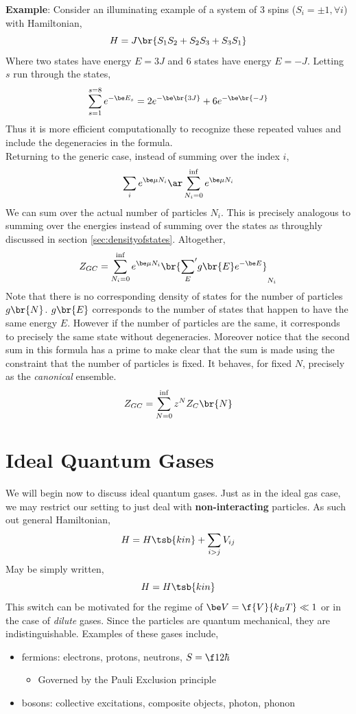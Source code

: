 \documentclass{article}
\begin{document}
{\textbf{Example}: Consider an illuminating example of a system of 3 spins ($S_i = \pm 1, \forall i$) with Hamiltonian,
\[ H = J \br{S_1 S_2 + S_2 S_3 + S_3 S_1} \]
Where two states have energy $E = 3J$ and 6 states have energy $E=-J$. Letting $s$ run through the states,
\[ \sum_{s=1}^{s=8} e^{-\be E_s} = 2e^{-\be\br{3J}} + 6e^{-\be\br{-J}} \]
Thus it is more efficient computationally to recognize these repeated values and include the degeneracies in the formula.\\

Returning to the generic case, instead of summing over the index $i$,
\[ \sum_{i} e^{\be \mu N_i} \ar \sum_{N_i = 0}^{\inf} e^{\be \mu N_i} \]
We can sum over the actual number of particles $N_i$. This is precisely analogous to summing over the energies instead of summing over the states as throughly discussed in section \ref{sec:densityofstates}. Altogether,
\[ Z_{GC} = \sum_{N_i = 0}^{\inf} e^{\be \mu N_i} \br{{\sum_{E}}' g\br{E}e^{-\be E}}_{N_i} \]
Note that there is no corresponding density of states for the number of particles $g\br{N}$. $g\br{E}$ corresponds to the number of states that happen to have the same energy $E$. However if the number of particles are the same, it corresponds to precisely the same state without degeneracies. Moreover notice that the second sum in this formula has a prime to make clear that the sum is made using the constraint that the number of particles is fixed. It behaves, for fixed $N$, precisely as the \textit{canonical} ensemble.
\[ Z_{GC} = \sum_{N = 0}^{\inf} z^{N} Z_{C}\br{N} \]


\section{Ideal Quantum Gases}

We will begin now to discuss ideal quantum gases. Just as in the ideal gas case, we may restrict our setting to just deal with \textbf{non-interacting} particles. As such out general Hamiltonian,
\[ H = H\tsb{kin} + \sum_{i>j} V_{ij} \]
May be simply written,
\[ H = H\tsb{kin} \]
This switch can be motivated for the regime of $\be V = \f{V}{k_B T} \ll 1$ or in the case of \textit{dilute} gases. Since the particles are quantum mechanical, they are indistinguishable. Examples of these gases include,
\begin{itemize}
    \item fermions: electrons, protons, neutrons, $S = \f12 \hbar$
    \begin{itemize}
        \item Governed by the Pauli Exclusion principle
    \end{itemize}
    \item bosons: collective excitations, composite objects, photon, phonon
\end{itemize}

}
\end{document}
